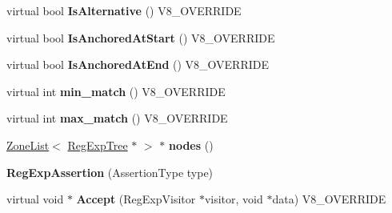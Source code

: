 \begin{DoxyCompactItemize}
\item 
\hypertarget{classv8_1_1internal_1_1_v8___f_i_n_a_l_a2db5dea903e8f983c5e23c416af3f563}{}virtual bool {\bfseries Is\+Alternative} () V8\+\_\+\+O\+V\+E\+R\+R\+I\+D\+E\label{classv8_1_1internal_1_1_v8___f_i_n_a_l_a2db5dea903e8f983c5e23c416af3f563}

\item 
\hypertarget{classv8_1_1internal_1_1_v8___f_i_n_a_l_a1303853ed1afec044f4a5c65f06e977b}{}virtual bool {\bfseries Is\+Anchored\+At\+Start} () V8\+\_\+\+O\+V\+E\+R\+R\+I\+D\+E\label{classv8_1_1internal_1_1_v8___f_i_n_a_l_a1303853ed1afec044f4a5c65f06e977b}

\item 
\hypertarget{classv8_1_1internal_1_1_v8___f_i_n_a_l_af12a212dba3f2fafc3dc142311b35977}{}virtual bool {\bfseries Is\+Anchored\+At\+End} () V8\+\_\+\+O\+V\+E\+R\+R\+I\+D\+E\label{classv8_1_1internal_1_1_v8___f_i_n_a_l_af12a212dba3f2fafc3dc142311b35977}

\item 
\hypertarget{classv8_1_1internal_1_1_v8___f_i_n_a_l_ac4abdb29d336dc24ef96695ac805b1ac}{}virtual int {\bfseries min\+\_\+match} () V8\+\_\+\+O\+V\+E\+R\+R\+I\+D\+E\label{classv8_1_1internal_1_1_v8___f_i_n_a_l_ac4abdb29d336dc24ef96695ac805b1ac}

\item 
\hypertarget{classv8_1_1internal_1_1_v8___f_i_n_a_l_a0b9dd74bfd4f1172c26a072c44da8669}{}virtual int {\bfseries max\+\_\+match} () V8\+\_\+\+O\+V\+E\+R\+R\+I\+D\+E\label{classv8_1_1internal_1_1_v8___f_i_n_a_l_a0b9dd74bfd4f1172c26a072c44da8669}

\item 
\hypertarget{classv8_1_1internal_1_1_v8___f_i_n_a_l_acc92783113573b26e9fb8a1820d5fcaf}{}\hyperlink{classv8_1_1internal_1_1_zone_list}{Zone\+List}$<$ \hyperlink{classv8_1_1internal_1_1_reg_exp_tree}{Reg\+Exp\+Tree} $\ast$ $>$ $\ast$ {\bfseries nodes} ()\label{classv8_1_1internal_1_1_v8___f_i_n_a_l_acc92783113573b26e9fb8a1820d5fcaf}

\item 
\hypertarget{classv8_1_1internal_1_1_v8___f_i_n_a_l_a4413d6dcaaff119aa26c1159845568a4}{}{\bfseries Reg\+Exp\+Assertion} (Assertion\+Type type)\label{classv8_1_1internal_1_1_v8___f_i_n_a_l_a4413d6dcaaff119aa26c1159845568a4}

\item 
\hypertarget{classv8_1_1internal_1_1_v8___f_i_n_a_l_a5a421cb811caf33f244ce08fe3e5ac14}{}virtual void $\ast$ {\bfseries Accept} (Reg\+Exp\+Visitor $\ast$visitor, void $\ast$data) V8\+\_\+\+O\+V\+E\+R\+R\+I\+D\+E\label{classv8_1_1internal_1_1_v8___f_i_n_a_l_a5a421cb811caf33f244ce08fe3e5ac14}


\end{DoxyCompactItemize}
